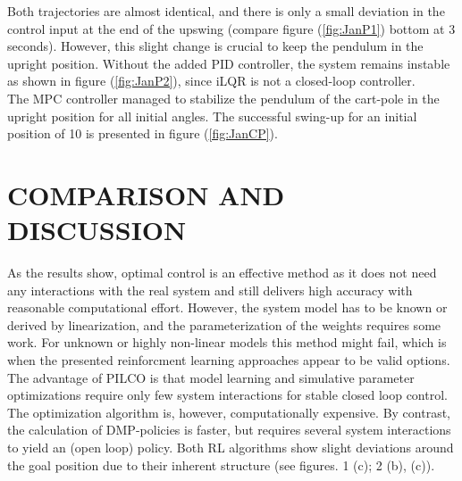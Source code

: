 \documentclass[letterpaper, 10 pt, conference]{ieeeconf}  %
\begin{document}
Both trajectories are almost identical, and there is only a small deviation in the control input at the end of the upswing (compare figure (\ref{fig:JanP1}) bottom at 3 seconds). However, this slight change is crucial to keep the pendulum in the upright position. Without the added PID controller, the system remains instable as shown in figure (\ref{fig:JanP2}), since iLQR is not a closed-loop controller.\\

The MPC controller managed to stabilize the pendulum of the cart-pole in the upright position for all initial angles. The successful swing-up for an initial position of 10 is presented in figure (\ref{fig:JanCP}). 



\section{COMPARISON AND DISCUSSION}
As the results show, optimal control is an effective method as it does not need any interactions with the real system and still delivers high accuracy with reasonable computational effort. However, the system model has to be known or derived by linearization, and the parameterization of the weights requires some work.
For unknown or highly non-linear models this method might fail, which is when the presented reinforcment learning approaches appear to be valid options. The advantage of PILCO is that model learning and simulative parameter optimizations require only few system interactions for stable closed loop control. The optimization algorithm is, however, computationally expensive. 
By contrast, the calculation of DMP-policies  is faster, but requires several system interactions to yield an (open loop) policy. Both RL algorithms show slight deviations around the goal position due to their inherent structure (see figures. 1 (c); 2 (b), (c)).
\end{document}
